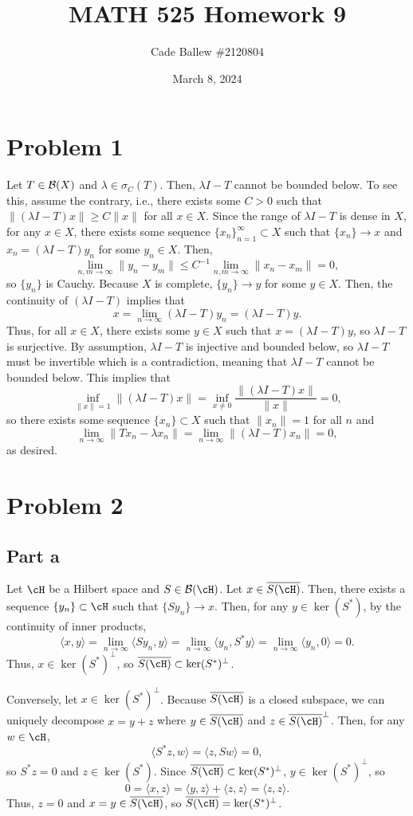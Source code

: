 \documentclass{article}
\title{MATH 525 Homework 9}
\author{Cade Ballew \#2120804}
\date{March 8, 2024}
\begin{document}
	
\maketitle
	
\section{Problem 1}
Let $T\in{\cal B}(X)$ and $\lambda\in\sigma_C(T)$. Then, $\lambda I-T$ cannot be bounded below. To see this, assume the contrary, i.e., there exists some $C>0$ such that $\|(\lambda I-T)x\|\geq C\|x\|$ for all $x\in X$. Since the range of $\lambda I-T$ is dense in $X$, for any $x\in X$, there exists some sequence $\{x_n\}_{n=1}^\infty\subset X$ such that $\{x_n\}\to x$ and $x_n=(\lambda I-T)y_n$ for some $y_n\in X$. Then,
\[
\lim_{n,m\to\infty}\|y_n-y_m\|\leq C^{-1}\lim_{n,m\to\infty}\|x_n-x_m\|=0,
\] 
so $\{y_n\}$ is Cauchy. Because $X$ is complete, $\{y_n\}\to y$ for some $y\in X$. Then, the continuity of $(\lambda I-T)$ implies that
\[
x=\lim_{n\to\infty}(\lambda I-T)y_n=(\lambda I-T)y.
\]
Thus, for all $x\in X$, there exists some $y\in X$ such that $x=(\lambda I-T)y$, so $\lambda I-T$ is surjective. By assumption, $\lambda I-T$ is injective and bounded below, so $\lambda I-T$ must be invertible which is a contradiction, meaning that $\lambda I-T$ cannot be bounded below. This implies that 
\[
\inf_{\|x\|=1}\|(\lambda I-T)x\|=\inf_{x\neq 0}\frac{\|(\lambda I-T)x\|}{\|x\|}=0,
\]
so there exists some sequence $\{x_n\}\subset X$ such that $\|x_n\|=1$ for all $n$ and 
\[
\lim_{n\to\infty}\|Tx_n-\lambda x_n\|=\lim_{n\to\infty}\|(\lambda I-T)x_n\|=0,
\]
as desired.

\section{Problem 2}
\subsection{Part a}
Let $\cH$ be a Hilbert space and $S\in\cB(\cH)$. Let $x\in\overline{S(\cH)}$. Then, there exists a sequence $\{y_n\}\subset \cH$ such that $\{Sy_n\}\to x$. Then, for any $y\in\ker(S^*)$, by the continuity of inner products,
\[
\langle x,y\rangle=\lim_{n\to\infty}\langle Sy_n,y\rangle=\lim_{n\to\infty}\langle y_n,S^*y\rangle=\lim_{n\to\infty}\langle y_n,0\rangle=0.
\]
Thus, $x\in\ker(S^*)^\perp$, so $\overline{S(\cH)}\subset\ker(S^*)^\perp$. 

Conversely, let $x\in\ker(S^*)^\perp$. Because $\overline{S(\cH)}$ is a closed subspace, we can uniquely decompose $x=y+z$ where $y\in\overline{S(\cH)}$ and $z\in\overline{S(\cH)}^\perp$. Then, for any $w\in \cH$,
\[
\langle S^*z,w\rangle=\langle z,Sw\rangle=0,
\]
so $S^*z=0$ and $z\in\ker(S^*)$. Since $\overline{S(\cH)}\subset \ker(S^*)^\perp$, $y\in\ker(S^*)^\perp$, so 
\[
0=\langle x,z\rangle=\langle y,z\rangle+\langle z,z\rangle=\langle z,z\rangle.
\]
Thus, $z=0$ and $x=y\in\overline{S(\cH)}$, so $\overline{S(\cH)}=\ker(S^*)^\perp$.
\end{document}
